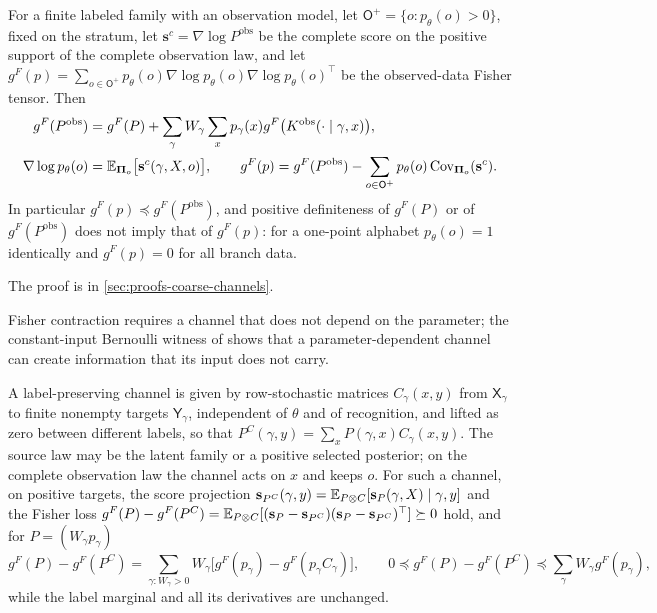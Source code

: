 For a finite labeled family with an observation model, let $\mathsf O^+=\{o:p_\theta(o)>0\}$, fixed
on the stratum, let $\mathbf s^c=\nabla\log P^{\mathrm{obs}}$ be the complete score on the positive
support of the complete observation law, and let
$g^F(p)=\sum_{o\in\mathsf O^+}p_\theta(o)\nabla\log p_\theta(o)\nabla\log p_\theta(o)^\top$ be the
observed-data Fisher tensor. Then
\begin{align}
g^F(P^{\mathrm{obs}})
&=g^F(P)+\sum_\gamma W_\gamma\sum_xp_\gamma(x)g^F\bigl(K^{\mathrm{obs}}(\cdot\mid\gamma,x)\bigr),
\label{eq:rg-thermo-finite-complete-observation-fisher}\\
\nabla\log p_\theta(o)
&=\mathbb E_{\boldsymbol\Pi_o}\bigl[\mathbf s^c(\gamma,X,o)\bigr],
\qquad
g^F(p)=g^F(P^{\mathrm{obs}})-\sum_{o\in\mathsf O^+}p_\theta(o)
\operatorname{Cov}_{\boldsymbol\Pi_o}(\mathbf s^c).
\label{eq:rg-thermo-finite-missing-information}
\end{align}
In particular $g^F(p)\preceq g^F(P^{\mathrm{obs}})$, and positive definiteness of $g^F(P)$ or of
$g^F(P^{\mathrm{obs}})$ does not imply that of $g^F(p)$: for a one-point alphabet $p_\theta(o)=1$
identically and $g^F(p)=0$ for all branch data. 

The proof is in \cref{sec:proofs-coarse-channels}.

Fisher contraction requires a channel that does not depend on the parameter; the constant-input
Bernoulli witness of  shows that a parameter-dependent
channel can create information that its input does not carry.

\label{def:rg-thermo-finite-channel}
\label{eq:rg-thermo-finite-channel}
\label{eq:rg-thermo-finite-score-projection}
\label{eq:rg-thermo-finite-fisher-loss}
A label-preserving channel is given by row-stochastic matrices $C_\gamma(x,y)$ from
$\mathsf X_\gamma$ to finite nonempty targets $\mathsf Y_\gamma$, independent of $\theta$ and of
recognition, and lifted as zero between different labels, so that
$P^C(\gamma,y)=\sum_xP(\gamma,x)C_\gamma(x,y)$. The source law may be the latent family or a
positive selected posterior; on the complete observation law the channel acts on $x$ and keeps $o$.
For such a channel, on positive targets, the score projection
$\mathbf s_{P^C}(\gamma,y)=\mathbb E_{P\otimes C}[\mathbf s_P(\gamma,X)\mid\gamma,y]$ and the Fisher loss
$g^F(P)-g^F(P^C)=\mathbb E_{P\otimes C}[(\mathbf s_P-\mathbf s_{P^C})(\mathbf s_P-\mathbf s_{P^C})^\top]\succeq0$
hold, and for $P=(W_\gamma p_\gamma)$
\begin{equation}
g^F(P)-g^F(P^C)=\sum_{\gamma:W_\gamma>0}W_\gamma\bigl[g^F(p_\gamma)-g^F(p_\gamma C_\gamma)\bigr],
\qquad
0\preceq g^F(P)-g^F(P^C)\preceq\sum_\gamma W_\gamma g^F(p_\gamma),
\label{eq:rg-thermo-finite-within-loss}
\end{equation}
while the label marginal and all its derivatives are unchanged. 

